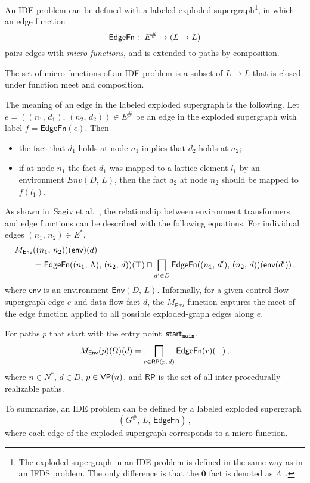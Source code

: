 {An IDE problem can be defined with a labeled exploded supergraph\footnote{
    The exploded supergraph in an IDE problem is defined in the same way as in an IFDS problem. The only difference is that the $\mathbf0$ fact is denoted as $\Lambda$~\cite{reps1995precise,sagiv1996precise}.
}, in which an edge function
\begin{equation}
  \textsf{EdgeFn}:\ E^\#\to(L\to L)
\end{equation}
pairs edges with \textit{micro functions}, and is extended to paths by composition.

The set of micro functions of an IDE problem is a subset of $L\to L$ that is closed under function meet and composition.

The meaning of an edge in the labeled exploded supergraph is the following. Let $e=((n_1,\,d_1),\,(n_2,\,d_2))\in E^\#$ be an edge in the exploded supergraph with label $f=\mathsf{EdgeFn}(e)$. Then
\begin{itemize}
	\item the fact that $d_1$ holds at node $n_1$ implies that $d_2$ holds at $n_2$;
  \item if at node $n_1$ the fact $d_1$ was mapped to a lattice element $l_1$ by an environment $Env(D,\,L)$, then the fact $d_2$ at node $n_2$ should be mapped to $f(l_1)$.
\end{itemize}

As shown in~Sagiv et al.~\cite{sagiv1996precise}, the relationship between environment transformers and edge functions can be described with the following equations. For individual edges $(n_1,\,n_2)\in E^*$,
\begin{align}\label{eq:envTransToEdgeFnEdge}
  M_\textsf{Env}&((n_1,\,n_2))(\textsf{env})(d)\notag\\
  &=\textsf{EdgeFn}((n_1,\,\Lambda),\,(n_2,\,d))(\top)\sqcap\bigsqcap_{d'\in D}\textsf{EdgeFn}((n_1,\,d'),\,(n_2,\,d))(\textsf{env}(d'))\,,
\end{align}
where $\textsf{env}$ is an environment $\textsf{Env}(D,\,L)$. Informally, for a given control-flow-supergraph edge $e$ and data-flow fact $d$, the $M_\textsf{Env}$ function captures the meet of the edge function applied to all possible exploded-graph edges along $e$.

For paths $p$ that start with the entry point~$\textsf{start}_\texttt{main}$,
\begin{equation}\label{eq:envTransToEdgefn}
  M_\textsf{Env}(p)(\Omega)(d)=\bigsqcap_{r\in\mathsf{RP}(p,\,d)}\textsf{EdgeFn}(r)(\top)\,,
\end{equation}
where $n\in N^*$, $d\in D$, $p\in\textsf{VP}(n)$, and $\mathsf{RP}$ is the set of all inter-procedurally realizable paths.

To summarize, an IDE problem can be defined by a labeled exploded supergraph 
\begin{equation}(G^\#,\,L,\,\mathsf{EdgeFn})\,,\end{equation}
where each edge of the exploded supergraph corresponds to a micro function.
}


